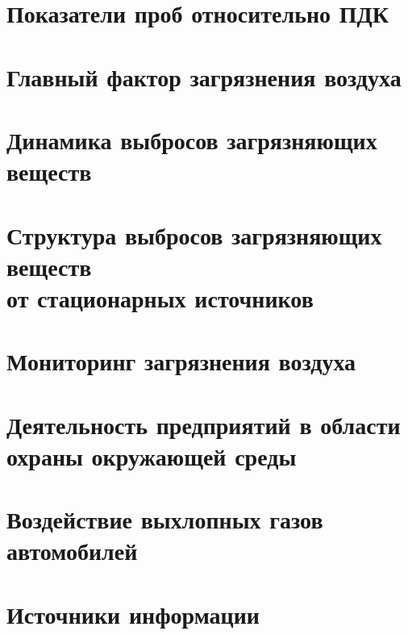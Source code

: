 



\section{Показатели проб относительно ПДК}
\begin{frame}{\insertsectionhead}
\end{frame}

\section{Главный фактор загрязнения воздуха}
\begin{frame}{\insertsectionhead}
\end{frame}

\section{Динамика выбросов загрязняющих веществ}
\begin{frame}{\insertsectionhead}
\end{frame}

\section{Структура выбросов загрязняющих веществ \\ от
стационарных источников}
\begin{frame}{\insertsectionhead}
\end{frame}

\section{Мониторинг загрязнения воздуха}
\begin{frame}{\insertsectionhead}
\end{frame}

\section{Деятельность предприятий в области \\ охраны окружающей среды}
\begin{frame}{\insertsectionhead}
\end{frame}

\section{Воздействие выхлопных газов автомобилей}
\begin{frame}{\insertsectionhead}
\end{frame}



\section{Источники информации}
\begin{frame}{\insertsectionhead}
\end{frame}
